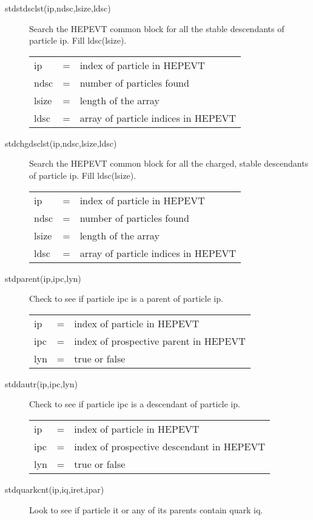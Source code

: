 \begin{description}
\item[stdstdsclst(ip,ndsc,lsize,ldsc)]
 Search the HEPEVT common block for all the stable descendants of particle ip.
 Fill ldsc(lsize). 

\begin{tabular}{lcl}
ip    & = & index of particle in HEPEVT \\
ndsc  & = & number of particles found \\
lsize & = & length of the array \\
ldsc  & = & array of particle indices in HEPEVT \\
\end{tabular}

\item[stdchgdsclst(ip,ndsc,lsize,ldsc)]
 Search the HEPEVT common block for all the charged, stable 
 descendants of particle ip.
 Fill ldsc(lsize). 

\begin{tabular}{lcl}
ip    & = & index of particle in HEPEVT \\
ndsc  & = & number of particles found \\
lsize & = & length of the array \\
ldsc  & = & array of particle indices in HEPEVT \\
\end{tabular}

\item[stdparent(ip,ipc,lyn)]
 Check to see if particle ipc is a parent of particle ip.

\begin{tabular}{lcl}
ip   & = & index of particle in HEPEVT \\
ipc  & = & index of prospective parent in HEPEVT \\
lyn  & = & true or false \\
\end{tabular}

\item[stddautr(ip,ipc,lyn)]
 Check to see if particle ipc is a descendant of particle ip.

\begin{tabular}{lcl}
ip   & = & index of particle in HEPEVT \\
ipc  & = & index of prospective descendant in HEPEVT \\
lyn  & = & true or false \\
\end{tabular}

\item[stdquarkcnt(ip,iq,iret,ipar)]
 Look to see if particle it or any of its parents contain quark iq.


\end{description}
